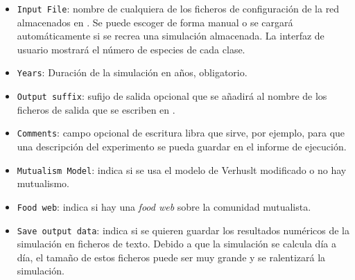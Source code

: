 \begin{itemize}
\item \texttt{Input File}: nombre de cualquiera de los ficheros de configuración de la red almacenados en . Se puede escoger de forma manual o se cargará automáticamente si se recrea una simulación almacenada. La interfaz de usuario mostrará el número de especies de cada clase.

\item \texttt{Years}:  Duración de la simulación en años, obligatorio.

\item \texttt{Output suffix}: sufijo de salida opcional que se añadirá al nombre de los ficheros de salida que se escriben en  .

\item \texttt{Comments}: campo opcional de escritura libra que sirve, por ejemplo, para que una descripción del experimento se pueda guardar en el informe de ejecución.

\item \texttt{Mutualism Model}: indica si se usa el modelo de Verhuslt modificado o no hay mutualismo.

\item \texttt{Food web}: indica si hay una \textit{food web} sobre la comunidad mutualista.

\item \texttt{Save output data}: indica si se quieren guardar los resultados numéricos de la simulación en ficheros de texto. Debido a que la simulación se calcula día a día, el tamaño de estos ficheros puede ser muy grande y se ralentizará la simulación.

\end{itemize}

